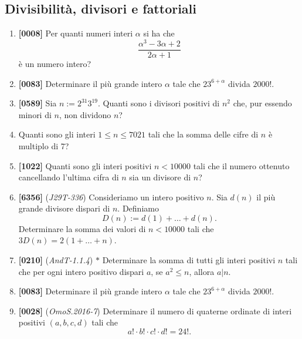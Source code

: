 \documentclass[10pt]{article}
\begin{document}
\subsection{Divisibilità, divisori e fattoriali}
\begin{enumerate}
	\item \textbf{[0008]} Per quanti numeri interi $\alpha$ si ha che
		\begin{equation*}
			\frac{\alpha^3-3\alpha+2}{2\alpha+1}
		\end{equation*}
		è un numero intero?

	\item \textbf{[0083]} Determinare il più grande intero $\alpha$ tale che $23^{6+\alpha}$ divida $2000!$.

	\item \textbf{[0589]} Sia $n:=2^{31}3^{19}$. Quanti sono i divisori positivi di $n^2$ che, pur essendo minori di $n$, non dividono $n$?

	\item Quanti sono gli interi $1\le n \le 7021$ tali che la somma delle cifre di $n$ è multiplo di 7?

	\item \textbf{[1022]} Quanti sono gli interi positivi $n<10000$ tali che il numero ottenuto cancellando l'ultima cifra di $n$ sia un divisore di $n$?

	\item \textbf{[6356]} (\textit{J29T-336}) Consideriamo un intero positivo $n$. Sia $d(n)$ il più grande divisore dispari di $n$. Definiamo
		\begin{equation*}
			D(n):=d(1)+\dots+d(n).
		\end{equation*}
		Determinare la somma dei valori di $n<10000$ tali che $3D(n)=2(1+\dots+n)$.

	\item \textbf{[0210]} (\textit{AndT-1.1.4}) $\ast$ Determinare la somma di tutti gli interi positivi $n$ tali che per ogni intero positivo dispari $a$, se $a^2\le n$, allora $a|n$.

	\item \textbf{[0083]} Determinare il più grande intero $\alpha$ tale che $23^{6+\alpha}$ divida $2000!$.

	\item \textbf{[0028]} (\textit{OmoS.2016-7}) Determinare il numero di quaterne ordinate di interi positivi $(a,b,c,d)$ tali che
		\begin{equation*}
			a!\cdot b!\cdot c!\cdot d!=24!.
		\end{equation*}

\end{enumerate}
\end{document}
